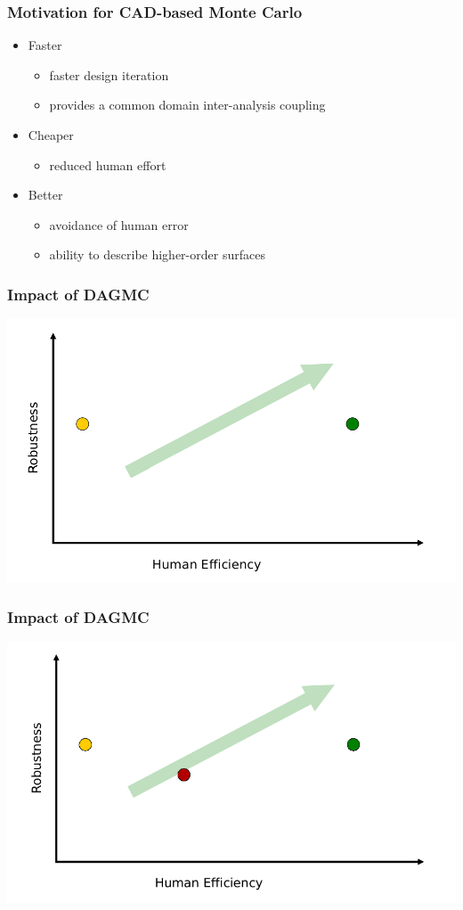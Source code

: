 \documentclass[14pt]{beamer}
\begin{document}
\begin{frame}
\frametitle{Motivation for CAD-based Monte Carlo}
\begin{itemize}
\vfill
\item Faster
	\begin{itemize}
	\item faster design iteration
	\item provides a common domain inter-analysis coupling
	\end{itemize}
\vfill
\item Cheaper
	\begin{itemize}
	\item reduced human effort
	\end{itemize}
\vfill
\item Better
	\begin{itemize}
	\item avoidance of human error
	\item ability to describe higher-order surfaces
	\end{itemize}
\end{itemize}

\end{frame}

\begin{frame}
\frametitle{Impact of DAGMC}
\vfill
\includegraphics[scale=0.35]{QualityGraph.png}
\end{frame}

\begin{frame}
\frametitle{Impact of DAGMC}
\includegraphics[scale=0.43, trim = 0 0 28 0]{InitialGraphImpact.png}
\end{frame}
\end{document}
